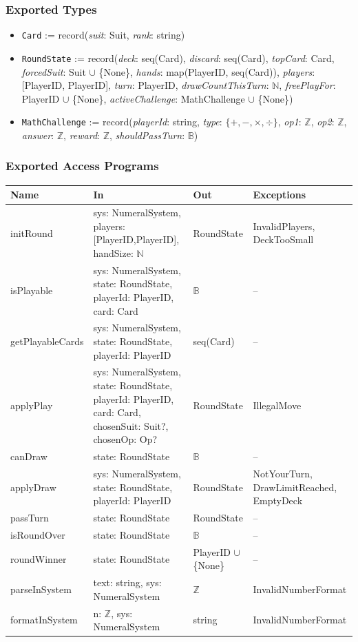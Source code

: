 \documentclass[12pt, titlepage]{article}
\begin{document}
\subsubsection{Exported Types}
\begin{itemize}
    \item \texttt{Card} := record(\textit{suit}: Suit, \textit{rank}: string)
    \item \texttt{RoundState} := record(\textit{deck}: seq(Card), \textit{discard}: seq(Card), \textit{topCard}: Card, \textit{forcedSuit}: Suit $\cup$ \{None\}, \textit{hands}: map(PlayerID, seq(Card)), \textit{players}: [PlayerID, PlayerID], \textit{turn}: PlayerID, \textit{drawCountThisTurn}: $\mathbb{N}$, \textit{freePlayFor}: PlayerID $\cup$ \{None\}, \textit{activeChallenge}: MathChallenge $\cup$ \{None\})
    \item \texttt{MathChallenge} := record(\textit{playerId}: string, \textit{type}: $\{+, -, \times, \div\}$, \textit{op1}: $\mathbb{Z}$, \textit{op2}: $\mathbb{Z}$, \textit{answer}: $\mathbb{Z}$, \textit{reward}: $\mathbb{Z}$, \textit{shouldPassTurn}: $\mathbb{B}$)
\end{itemize}

\subsubsection{Exported Access Programs}

\begin{center}
\begin{tabular}{p{3.5cm} p{5.0cm} p{3.0cm} p{3.5cm}}
\toprule
\textbf{Name} & \textbf{In} & \textbf{Out} & \textbf{Exceptions} \\
\midrule
initRound & sys: NumeralSystem, players: [PlayerID,PlayerID], handSize: $\mathbb{N}$ & RoundState & InvalidPlayers, DeckTooSmall \\
isPlayable & sys: NumeralSystem, state: RoundState, playerId: PlayerID, card: Card & $\mathbb{B}$ & -- \\
getPlayableCards & sys: NumeralSystem, state: RoundState, playerId: PlayerID & seq(Card) & -- \\
applyPlay & sys: NumeralSystem, state: RoundState, playerId: PlayerID, card: Card, chosenSuit: Suit?, chosenOp: Op? & RoundState & IllegalMove \\
canDraw & state: RoundState & $\mathbb{B}$ & -- \\
applyDraw & sys: NumeralSystem, state: RoundState, playerId: PlayerID & RoundState & NotYourTurn, DrawLimitReached, EmptyDeck \\
passTurn & state: RoundState & RoundState & -- \\
isRoundOver & state: RoundState & $\mathbb{B}$ & -- \\
roundWinner & state: RoundState & PlayerID $\cup$ \{None\} & -- \\
parseInSystem & text: string, sys: NumeralSystem & $\mathbb{Z}$ & InvalidNumberFormat \\
formatInSystem & n: $\mathbb{Z}$, sys: NumeralSystem & string & InvalidNumberFormat \\
\bottomrule
\end{tabular}
\end{center}
\end{document}
